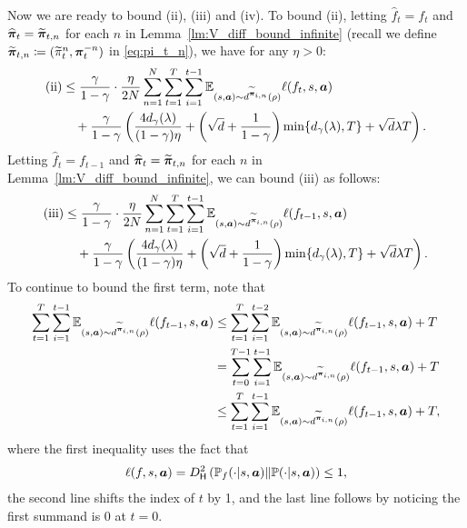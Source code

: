 Now we are ready to bound (ii), (iii) and (iv). To bound (ii), letting $\widehat{f}_t=f_t$ and
$\widehat{{\bm{\pi}}}_t=\widetilde{{\bm{\pi}}}_{t,n}$ for each $n$ in Lemma~\ref{lm:V_diff_bound_infinite} (recall we define $\widetilde{{\bm{\pi}}}_{t,n}\coloneqq (\widetilde{\pi}_t^n,{\bm{\pi}}_t^{-n})$ in \eqref{eq:pi_t_n}), we have for any $\eta>0$:
\begin{align}\label{eq:b_bound'} 
    \text{(ii)}&\leq \frac{\gamma}{1-\gamma}\cdot\frac{\eta}{2N}\sum_{n=1}^N\sum_{t=1}^T \sum_{i=1}^{t-1} \mathbb{E}_{(s,{\bm{a}})\sim d^{\widetilde{{\bm{\pi}}}_{i,n}}(\rho)}\ell(f_t,s,{\bm{a}}) \notag\\
    &\quad+\frac{\gamma}{1-\gamma}\left(\frac{4d_\gamma(\lambda)}{(1-\gamma)\eta}
    + \left(\sqrt{d}+\frac{1}{1-\gamma}\right) \min\{d_\gamma(\lambda),T\} +\sqrt{d} \lambda T\right).
\end{align}
Letting $\widehat{f}_t=f_{t-1}$ and
$\widehat{{\bm{\pi}}}_t=\widetilde{{\bm{\pi}}}_{t,n}$ for each $n$ in Lemma~\ref{lm:V_diff_bound_infinite}, we can bound (iii) as follows:
\begin{align}\label{eq:c_bound'_pre}
    \text{(iii)}&\leq \frac{\gamma}{1-\gamma}\cdot\frac{\eta}{2N}\sum_{n=1}^N\sum_{t=1}^T \sum_{i=1}^{t-1} \mathbb{E}_{(s,{\bm{a}})\sim d^{\widetilde{{\bm{\pi}}}_{i,n}}(\rho)}\ell(f_{t-1},s,{\bm{a}}) \notag\\
    &\quad+\frac{\gamma}{1-\gamma}\left(\frac{4d_\gamma(\lambda)}{(1-\gamma)\eta}
    + \left(\sqrt{d}+\frac{1}{1-\gamma}\right) \min\{d_\gamma(\lambda),T\} +\sqrt{d} \lambda T\right).
\end{align}
To continue to bound the first term, note that
\begin{align}
    \sum_{t=1}^T \sum_{i=1}^{t-1} \mathbb{E}_{(s,{\bm{a}})\sim d^{\widetilde{{\bm{\pi}}}_{i,n}}(\rho)}\ell(f_{t-1},s,{\bm{a}}) &\leq \sum_{t=1}^T \sum_{i=1}^{t-2} \mathbb{E}_{(s,{\bm{a}})\sim d^{\widetilde{{\bm{\pi}}}_{i,n}}(\rho)}\ell(f_{t-1},s,{\bm{a}}) + T\notag\\
    &= \sum_{t=0}^{T-1} \sum_{i=1}^{t-1} \mathbb{E}_{(s,{\bm{a}})\sim d^{\widetilde{{\bm{\pi}}}_{i,n}}(\rho)}\ell(f_{t-1},s,{\bm{a}}) + T\notag\\
    &\leq \sum_{t=1}^{T} \sum_{i=1}^{t-1} \mathbb{E}_{(s,{\bm{a}})\sim d^{\widetilde{{\bm{\pi}}}_{i,n}}(\rho)}\ell(f_{t-1},s,{\bm{a}}) + T,
\end{align}
where the first inequality uses the fact that
\begin{align}
    \ell(f,s,{\bm{a}})=D_{\mathsf{H}}^2\left({\mathbb P}_{f}(\cdot|s,{\bm{a}})\|{\mathbb P}(\cdot|s,{\bm{a}})\right)\leq 1,
\end{align}
the second line shifts the index of $t$ by 1, and the last line follows by noticing the first summand is 0 at $t=0$.

